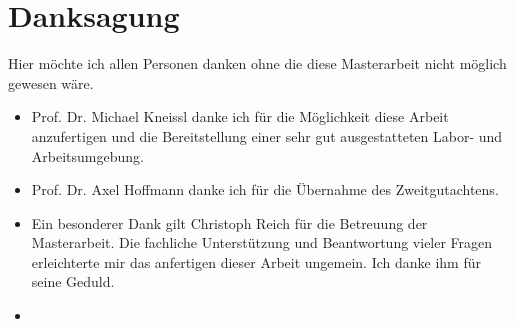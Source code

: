 \thispagestyle{fancy}
\justifying
\chapter{Danksagung}

Hier möchte ich allen Personen danken ohne die diese Masterarbeit nicht möglich gewesen wäre.
\begin{itemize}
	\item Prof. Dr. Michael Kneissl danke ich für die Möglichkeit diese Arbeit anzufertigen und die Bereitstellung einer sehr gut ausgestatteten Labor- und Arbeitsumgebung.
	\item Prof. Dr. Axel Hoffmann danke ich für die Übernahme des Zweitgutachtens.
	\item Ein besonderer Dank gilt Christoph Reich für die Betreuung der Masterarbeit. Die fachliche Unterstützung und Beantwortung vieler Fragen erleichterte mir das anfertigen dieser Arbeit ungemein. Ich danke ihm für seine Geduld. 
	\item
	
\end{itemize}